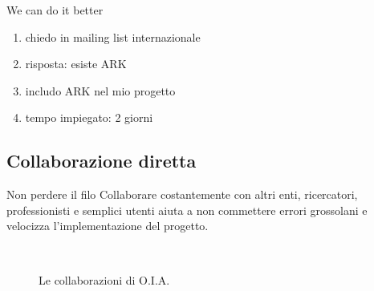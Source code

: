 \documentclass{beamer}
\begin{document}
			\begin{frame}{We can do it better}
				\begin{enumerate}
					\item chiedo in mailing list internazionale
					\item risposta: esiste ARK
					\item includo ARK nel mio progetto
					\item tempo impiegato: 2 giorni
				\end{enumerate}
			\end{frame}

		\subsection{Collaborazione diretta}

			\begin{frame}{Non perdere il filo}
				Collaborare costantemente con altri enti, ricercatori, professionisti e semplici utenti aiuta a non commettere errori grossolani e velocizza l'implementazione del progetto.

				\begin{figure}
					\centering
					\hfill
					\hfill
					\\
					\caption[]{Le collaborazioni di O.I.A.}
					\label{fig:collab}
				\end{figure}
			\end{frame}
\end{document}
